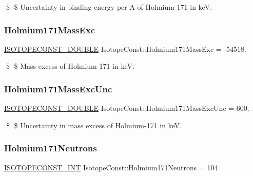 \$ \$ Uncertainty in binding energy per A of Holmium-\/171 in keV. \mbox{\label{group___isotope_const-_holmium-_ho171_ga917502926219c401dc2091b7a2cb155c}} 
\subsubsection{\texorpdfstring{Holmium171\+Mass\+Exc}{Holmium171MassExc}}
{\footnotesize\ttfamily \mbox{\hyperlink{group___isotope_const-_macros_ga8f45a7272ce02c0b4c65c44636ed719a}{I\+S\+O\+T\+O\+P\+E\+C\+O\+N\+S\+T\+\_\+\+D\+O\+U\+B\+LE}} Isotope\+Const\+::\+Holmium171\+Mass\+Exc = -\/54518.}

\$ \$ Mass excess of Holmium-\/171 in keV. \mbox{\label{group___isotope_const-_holmium-_ho171_gaaa86c2834afcf39595a50225ae06c34e}} 
\subsubsection{\texorpdfstring{Holmium171\+Mass\+Exc\+Unc}{Holmium171MassExcUnc}}
{\footnotesize\ttfamily \mbox{\hyperlink{group___isotope_const-_macros_ga8f45a7272ce02c0b4c65c44636ed719a}{I\+S\+O\+T\+O\+P\+E\+C\+O\+N\+S\+T\+\_\+\+D\+O\+U\+B\+LE}} Isotope\+Const\+::\+Holmium171\+Mass\+Exc\+Unc = 600.}

\$ \$ Uncertainty in mass excess of Holmium-\/171 in keV. \mbox{\label{group___isotope_const-_holmium-_ho171_ga53d8c027419c8754c54539c4ff2e0886}} 
\subsubsection{\texorpdfstring{Holmium171\+Neutrons}{Holmium171Neutrons}}
{\footnotesize\ttfamily \mbox{\hyperlink{group___isotope_const-_macros_ga5f18360b3e99483a35c32d789e62621c}{I\+S\+O\+T\+O\+P\+E\+C\+O\+N\+S\+T\+\_\+\+I\+NT}} Isotope\+Const\+::\+Holmium171\+Neutrons = 104}

